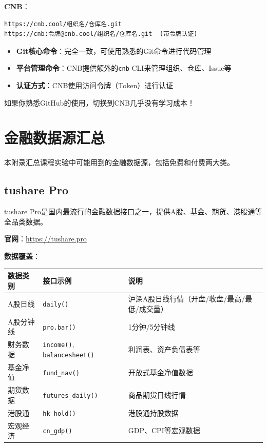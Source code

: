 \textbf{CNB}：

\begin{lstlisting}[style=shell]
https://cnb.cool/组织名/仓库名.git
https://cnb:令牌@cnb.cool/组织名/仓库名.git  (带令牌认证)
\end{lstlisting}

\begin{notebox}[总结]
\begin{itemize}[leftmargin=1em]
  \item \textbf{Git核心命令}：完全一致，可使用熟悉的Git命令进行代码管理
  \item \textbf{平台管理命令}：CNB提供额外的\texttt{cnb} CLI来管理组织、仓库、Issue等
  \item \textbf{认证方式}：CNB使用访问令牌（Token）进行认证
\end{itemize}

如果你熟悉GitHub的使用，切换到CNB几乎没有学习成本！
\end{notebox}


\chapter{金融数据源汇总}

本附录汇总课程实验中可能用到的金融数据源，包括免费和付费两大类。

\section{tushare Pro}

tushare Pro是国内最流行的金融数据接口之一，提供A股、基金、期货、港股通等全品类数据。

\textbf{官网}：\url{https://tushare.pro}

\textbf{数据覆盖}：

\begin{table}[H]
\centering
\small
\begin{tabular}{llp{6cm}}
\toprule
\textbf{数据类别} & \textbf{接口示例} & \textbf{说明} \\
\midrule
A股日线 & \texttt{daily()} & 沪深A股日线行情（开盘/收盘/最高/最低/成交量） \\
A股分钟线 & \texttt{pro.bar()} & 1分钟/5分钟线 \\
财务数据 & \texttt{income()}, \texttt{balancesheet()} & 利润表、资产负债表等 \\
基金净值 & \texttt{fund\_nav()} & 开放式基金净值数据 \\
期货数据 & \texttt{futures\_daily()} & 商品期货日线行情 \\
港股通 & \texttt{hk\_hold()} & 港股通持股数据 \\
宏观经济 & \texttt{cn\_gdp()} & GDP、CPI等宏观数据 \\
\bottomrule
\end{tabular}
\end{table}

